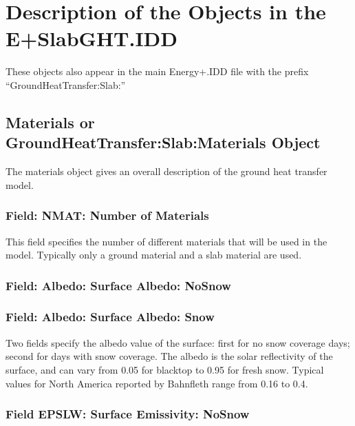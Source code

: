 \section{Description of the Objects in the E+SlabGHT.IDD}\label{description-of-the-objects-in-the-eslabght.idd}

These objects also appear in the main Energy+.IDD file with the prefix ``GroundHeatTransfer:Slab:''

\subsection{Materials or GroundHeatTransfer:Slab:Materials Object}\label{materials-or-groundheattransferslabmaterials-object}

The materials object gives an overall description of the ground heat transfer model.

\subsubsection{Field: NMAT: Number of Materials}\label{field-nmat-number-of-materials}

This field specifies the number of different materials that will be used in the model. Typically only a ground material and a slab material are used.

\subsubsection{Field: Albedo: Surface Albedo: NoSnow}\label{field-albedo-surface-albedo-nosnow}

\subsubsection{Field: Albedo: Surface Albedo: Snow}\label{field-albedo-surface-albedo-snow}

Two fields specify the albedo value of the surface: first for no snow coverage days; second for days with snow coverage. The albedo is the solar reflectivity of the surface, and can vary from 0.05 for blacktop to 0.95 for fresh snow. Typical values for North America reported by Bahnfleth range from 0.16 to 0.4.

\subsubsection{Field EPSLW: Surface Emissivity: NoSnow}\label{field-epslw-surface-emissivity-nosnow}

